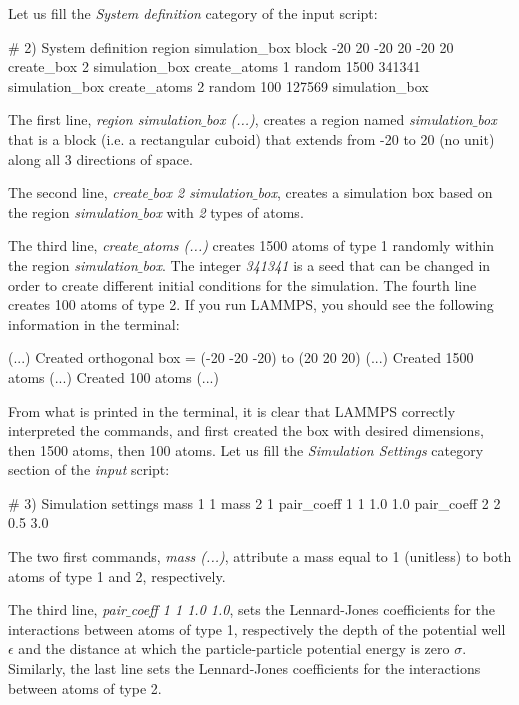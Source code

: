 \noindent Let us fill the \textit{System definition} category of the input script:

\begin{lcverbatim}
# 2) System definition
region simulation_box block -20 20 -20 20 -20 20
create_box 2 simulation_box
create_atoms 1 random 1500 341341 simulation_box
create_atoms 2 random 100 127569 simulation_box
\end{lcverbatim}

\noindent The first line, \textit{region simulation$\_$box (...)}, creates a region
named \textit{simulation$\_$box} that is a block (i.e. a rectangular cuboid) that
extends from -20 to 20 (no unit) along all 3 directions of space.

The second line, \textit{create$\_$box 2 simulation$\_$box}, creates a simulation box based on
the region \textit{simulation$\_$box} with \textit{2} types of atoms.

The third line, \textit{create$\_$atoms (...)} creates 1500 atoms of type 1
randomly within the region \textit{simulation$\_$box}. The integer \textit{341341} is a
seed that can be changed in order to create different
initial conditions for the simulation. The fourth line
creates 100 atoms of type 2.
If you run LAMMPS, you should see the following information in the
terminal:

\begin{lcverbatim}
(...)
Created orthogonal box = (-20 -20 -20) to (20 20 20)
(...)
Created 1500 atoms
(...)
Created 100 atoms
(...)
\end{lcverbatim}

\noindent From what is printed in the terminal, it is clear that
LAMMPS correctly interpreted the commands, and first created
the box with desired dimensions, then 1500 atoms, then 100
atoms.
Let us fill the \textit{Simulation Settings} category section of
the \textit{input} script:

\begin{lcverbatim}
# 3) Simulation settings
mass 1 1
mass 2 1
pair_coeff 1 1 1.0 1.0
pair_coeff 2 2 0.5 3.0
\end{lcverbatim}

\noindent The two first commands, \textit{mass (...)}, attribute a mass
equal to 1 (unitless) to both atoms of type 1 and 2,
respectively. 

The third line, \textit{pair$\_$coeff 1 1 1.0 1.0}, sets the Lennard-Jones
coefficients for the interactions between atoms of type 1,
respectively the depth of the potential well
$\epsilon$ and the distance at which the
particle-particle potential energy is zero $\sigma$. 
Similarly, the last line sets the Lennard-Jones coefficients for
the interactions between atoms of type 2.

